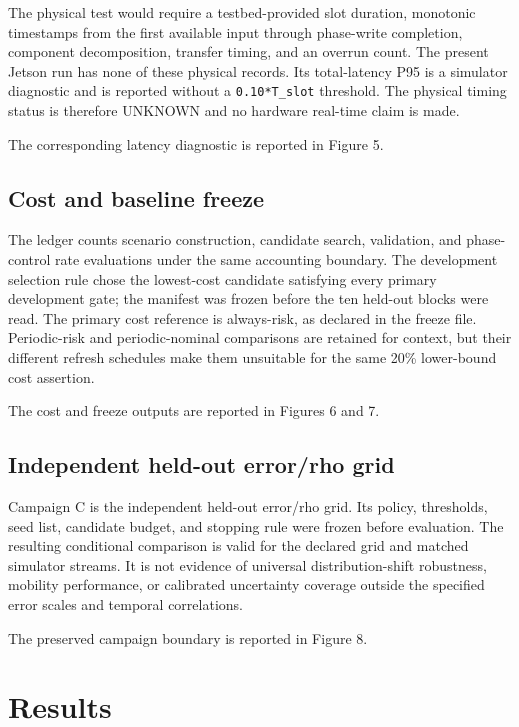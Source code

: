 \documentclass[10pt,twocolumn]{article}
\begin{document}
The physical test would require a testbed-provided slot duration,
monotonic timestamps from the first available input through phase-write
completion, component decomposition, transfer timing, and an overrun
count. The present Jetson run has none of these physical records. Its
total-latency P95 is a simulator diagnostic and is reported without a
\texttt{0.10*T\_slot} threshold. The physical timing status is therefore
UNKNOWN and no hardware real-time claim is made.

The corresponding latency diagnostic is reported in Figure 5.

\subsection{Cost and baseline
freeze}\label{cost-and-baseline-freeze}

The ledger counts scenario construction, candidate search, validation,
and phase-control rate evaluations under the same accounting boundary.
The development selection rule chose the lowest-cost candidate
satisfying every primary development gate; the manifest was frozen
before the ten held-out blocks were read. The primary cost reference is
always-risk, as declared in the freeze file. Periodic-risk and
periodic-nominal comparisons are retained for context, but their
different refresh schedules make them unsuitable for the same 20\%
lower-bound cost assertion.

The cost and freeze outputs are reported in Figures 6 and 7.

\subsection{Independent held-out error/rho
grid}\label{independent-held-out-errorrho-grid}

Campaign C is the independent held-out error/rho grid. Its policy,
thresholds, seed list, candidate budget, and stopping rule were frozen
before evaluation. The resulting conditional comparison is valid for the
declared grid and matched simulator streams. It is not evidence of
universal distribution-shift robustness, mobility performance, or
calibrated uncertainty coverage outside the specified error scales and
temporal correlations.

The preserved campaign boundary is reported in Figure 8.

\section{Results}\label{results}
\end{document}
